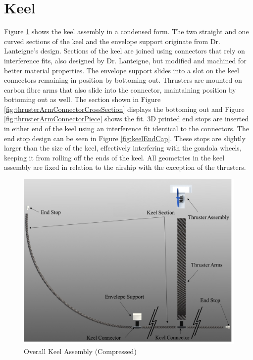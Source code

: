\documentclass[../main.tex]{subfiles}
\begin{document}
\section{Keel}
Figure \ref{fig:keelAssemblyCompressedThruster} shows the keel assembly in a condensed form. The two straight and one curved sections of the keel and the envelope support originate from Dr. Lanteigne's design. Sections of the keel are joined using connectors that rely on interference fits, also designed by Dr. Lanteigne, but modified and machined for better material properties. The envelope support slides into a slot on the keel connectors remaining in position by bottoming out. Thrusters are mounted on carbon fibre arms that also slide into the connector, maintaining position by bottoming out as well. The section shown in Figure \ref{fig:thrusterArmConnectorCrossSection} displays the bottoming out and Figure \ref{fig:thrusterArmConnectorPiece} shows the fit. 3D printed end stops are inserted in either end of the keel using an interference fit identical to the connectors. The end stop design can be seen in Figure \ref{fig:keelEndCap}. These stops are slightly larger than the size of the keel, effectively interfering with the gondola wheels, keeping it from rolling off the ends of the keel. All geometries in the keel assembly are fixed in relation to the airship with the exception of the thrusters.
\\
\begin{figure}[H]
	\centering
	\includegraphics[width=.8\linewidth]{img/design/keel/keelAssemblyCompressedThruster.png}
	\caption{Overall Keel Assembly (Compressed)}
	\label{fig:keelAssemblyCompressedThruster}
\end{figure}
\end{document}
